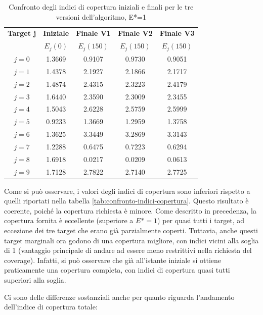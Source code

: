 \documentclass[twoside]{article}
\begin{document}
\begin{table}[H]
\centering
\begin{tabular}{ccccc}
\toprule
\textbf{Target j} & \textbf{Iniziale} & \textbf{Finale V1} & \textbf{Finale V2} & \textbf{Finale V3} \\
 & \(E_j(0)\) & \(E_j(150)\) & \(E_j(150)\) & \(E_j(150)\) \\
\midrule
\(j=0\) & 1.3669 & 0.9107 & 0.9730 & 0.9051 \\
\(j=1\) & 1.4378 & 2.1927 & 2.1866 & 2.1717 \\
\(j=2\) & 1.4874 & 2.4315 & 2.3223 & 2.4179 \\
\(j=3\) & 1.6440 & 2.3590 & 2.3009 & 2.3455 \\
\(j=4\) & 1.5043 & 2.6228 & 2.5759 & 2.5999 \\
\(j=5\) & 0.9233 & 1.3669 & 1.2959 & 1.3758 \\
\(j=6\) & 1.3625 & 3.3449 & 3.2869 & 3.3143 \\
\(j=7\) & 1.2288 & 0.6475 & 0.7223 & 0.6294 \\
\(j=8\) & 1.6918 & 0.0217 & 0.0209 & 0.0613 \\
\(j=9\) & 1.7128 & 2.7822 & 2.7140 & 2.7725 \\
\bottomrule
\end{tabular}
\caption{Confronto degli indici di copertura iniziali e finali per le tre versioni dell'algoritmo, E*=1}
\label{tab:confronto-indici-copertura-E*=1}
\end{table}

Come si può osservare, i valori degli indici di copertura sono inferiori rispetto a quelli riportati nella tabella \ref{tab:confronto-indici-copertura}. Questo risultato è coerente, poiché la copertura richiesta è minore. Come descritto in precedenza, la copertura fornita è eccellente (superiore a \ensuremath{E* = 1}) per quasi tutti i target, ad eccezione dei tre target che erano già parzialmente coperti. Tuttavia, anche questi target marginali ora godono di una copertura migliore, con indici vicini alla soglia di 1 (vantaggio principale di andare ad essere meno restrittivi nella richiesta del coverage). Infatti, si può osservare che già all'istante iniziale si ottiene praticamente una copertura completa, con indici di copertura quasi tutti superiori alla soglia.

\vspace{\baselineskip}
Ci sono delle differenze sostanziali anche per quanto riguarda l'andamento dell'indice di copertura totale:
\end{document}
